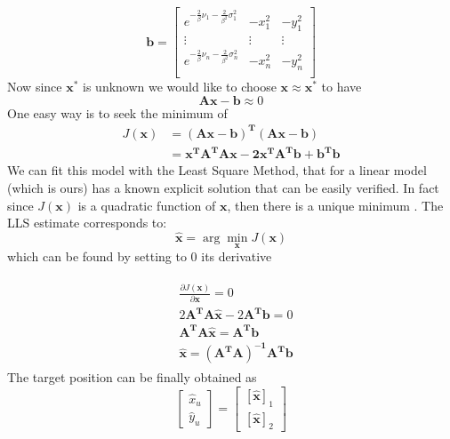 \documentclass[12pt]{report}
\begin{document}
$$\mathbf{b}=    \begin{bmatrix}
        e^{-\frac{2}{\beta}\nu_1-\frac{2}{\beta^2}\sigma^2_1} & -x_1^2 & -y_1^2\\
        \vdots&\vdots&\vdots\\
        e^{-\frac{2}{\beta}\nu_n-\frac{2}{\beta^2}\sigma^2_n} & -x_n^2 & -y_n^2\\
    \end{bmatrix}$$
Now since $\mathbf{x^*}$ is unknown we would like to choose $\mathbf{x}\approx\mathbf{x^*}$ to have 
\begin{equation}
    \mathbf{Ax-b}\approx0
\end{equation}
One easy way is to seek the minimum of 
\begin{align}
    J(\mathbf{x})&=\mathbf{(Ax-b)^T(Ax - b)}\\
    &=\mathbf{x^TA^TAx-2x^TA^Tb+b^Tb}
\end{align}
We can fit this model with the Least Square Method, that for a linear model (which is ours) has a known explicit solution \cite{10.5555/1557273} that can be easily verified. In fact since $J(\mathbf{x})$ is a quadratic function of $\mathbf{x}$, then there is a unique minimum \cite{Ortega1987,rzk}. The LLS estimate corresponds to:
\begin{equation}
    \hat{\mathbf{x}}=\arg \min_\mathbf{x} J(\mathbf{x})
\end{equation}
which can be found by setting to $0$ its derivative
    
\begin{align}
\begin{split}
&\frac{\partial J(\mathbf{x})}{\partial \mathbf{x}}=0\\
    &2\mathbf{A^TA}\hat{\mathbf{x}}-2\mathbf{A^Tb}=0\\
    &\mathbf{A^TA\hat{x}}=\mathbf{A^Tb}\\
    &\hat{\mathbf{x}}=\mathbf{(A^TA)^{-1}A^Tb}
\end{split}
\end{align}
The target position can be finally obtained as 
\begin{equation}
\begin{bmatrix}
    \hat{x}_u\\
    \hat{y}_u
\end{bmatrix}=
\begin{bmatrix}
    [\hat{\mathbf{x}}]_1\\
    [\hat{\mathbf{x}}]_2
\end{bmatrix}
\end{equation}
\clearpage
\end{document}

